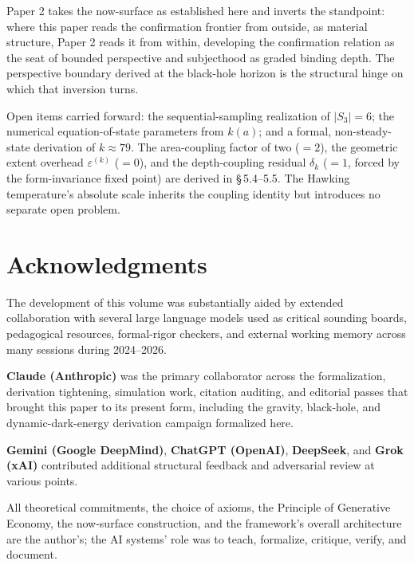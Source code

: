 \documentclass[11pt,oneside]{report}
\theoremstyle{definition}
\theoremstyle{remark}
\begin{document}
Paper 2 takes the now-surface as established here and inverts the
standpoint: where this paper reads the confirmation frontier from
outside, as material structure, Paper 2 reads it from within, developing
the confirmation relation as the seat of bounded perspective and
subjecthood as graded binding depth. The perspective boundary derived at
the black-hole horizon is the structural hinge on which that inversion
turns.

Open items carried forward: the
sequential-sampling realization of
\ensuremath{|S_3| = 6}; the numerical equation-of-state parameters from
\ensuremath{k(a)}; and a formal, non-steady-state derivation of
\ensuremath{k \approx 79}. The area-coupling factor of two (\ensuremath{= 2}), the geometric
extent overhead \ensuremath{\varepsilon^{(k)}} (\ensuremath{= 0}), and the depth-coupling residual
\ensuremath{\delta_k} (\ensuremath{= 1}, forced by the form-invariance fixed point) are derived
in \S\,5.4--5.5. The Hawking
temperature's absolute scale inherits the coupling identity but introduces
no separate open problem.

\section*{Acknowledgments}

The development of this volume was substantially aided by extended
collaboration with several large language models used as critical
sounding boards, pedagogical resources, formal-rigor checkers, and
external working memory across many sessions during 2024--2026.

\textbf{Claude (Anthropic)} was the primary collaborator across the
formalization, derivation tightening, simulation work, citation auditing,
and editorial passes that brought this paper to its present form,
including the gravity, black-hole, and dynamic-dark-energy derivation
campaign formalized here.

\textbf{Gemini (Google DeepMind)}, \textbf{ChatGPT (OpenAI)},
\textbf{DeepSeek}, and \textbf{Grok (xAI)} contributed additional
structural feedback and adversarial review at various points.

All theoretical commitments, the choice of axioms, the Principle of
Generative Economy, the now-surface construction, and the framework's
overall architecture are the author's; the AI systems' role was to teach,
formalize, critique, verify, and document.
\end{document}
